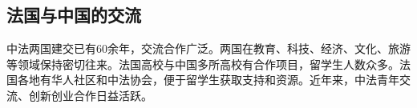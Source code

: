 \subsection{法国与中国的交流}

中法两国建交已有60余年，交流合作广泛。两国在教育、科技、经济、文化、旅游等领域保持密切往来。法国高校与中国多所高校有合作项目，留学生人数众多。法国各地有华人社区和中法协会，便于留学生获取支持和资源。近年来，中法青年交流、创新创业合作日益活跃。
